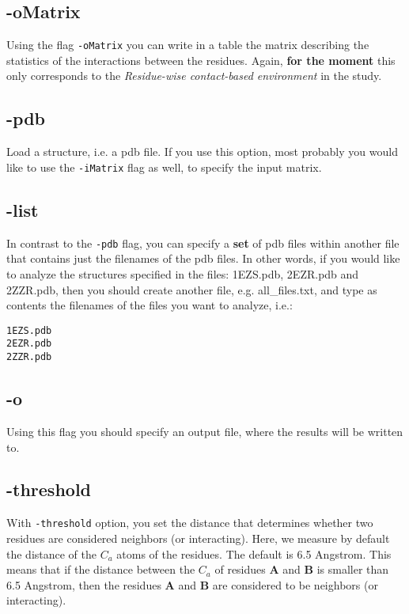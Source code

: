 \subsection*{-oMatrix}
Using the flag \verb!-oMatrix! you can write in a table the matrix describing the statistics of the interactions between the residues. Again, {\bf  for the moment} this only corresponds to the {\it Residue-wise contact-based environment} in the \cite{Jha2011} study. 

\subsection*{-pdb}
Load a structure, i.e. a pdb file. If you use this option, most probably you would like to use the \verb!-iMatrix! flag as well, to specify the input matrix. 


\subsection*{-list}
In contrast to the \verb!-pdb! flag, you can specify a {\bf set} of pdb files within another file that contains just the filenames of the pdb files. In other words, if you would like to analyze the structures specified in the files: 1EZS.pdb, 2EZR.pdb and 2ZZR.pdb, then you should create another file, e.g. all\_files.txt, and type as contents the filenames of the files you want to analyze, i.e.: 

\begin{verbatim}
1EZS.pdb
2EZR.pdb
2ZZR.pdb
\end{verbatim}


\subsection*{-o}
Using this flag you should specify an output file, where the results will be written to. 

\subsection*{-threshold}
With \verb!-threshold! option, you set the distance that determines whether two residues are considered neighbors (or interacting). Here, we measure by default the distance of the $C_a$ atoms of the residues. The default is 6.5 Angstrom. This means that if the distance between the $C_a$ of residues {\bf A} and {\bf B} is smaller than 6.5 Angstrom, then the residues {\bf A} and {\bf B} are considered to be neighbors (or interacting). 

